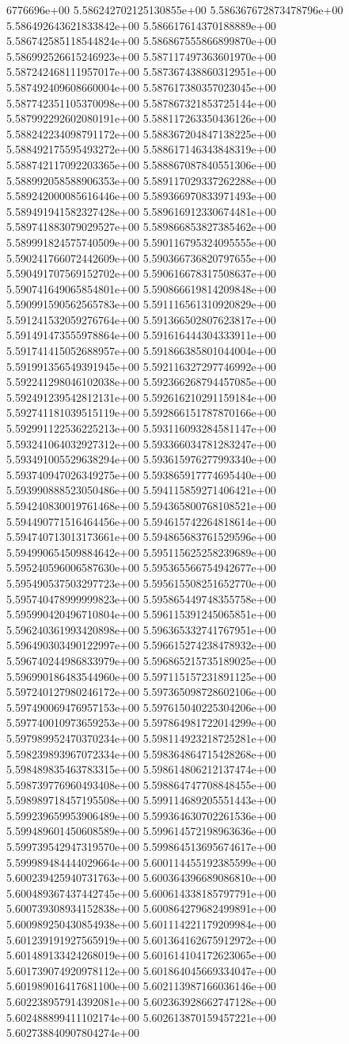 6776696e+00	5.586242702125130855e+00	5.586367672873478796e+00	5.586492643621833842e+00	5.586617614370188889e+00	5.586742585118544824e+00	5.586867555866899870e+00	5.586992526615246923e+00	5.587117497363601970e+00	5.587242468111957017e+00	5.587367438860312951e+00	5.587492409608660004e+00	5.587617380357023045e+00	5.587742351105370098e+00	5.587867321853725144e+00	5.587992292602080191e+00	5.588117263350436126e+00	5.588242234098791172e+00	5.588367204847138225e+00	5.588492175595493272e+00	5.588617146343848319e+00	5.588742117092203365e+00	5.588867087840551306e+00	5.588992058588906353e+00	5.589117029337262288e+00	5.589242000085616446e+00	5.589366970833971493e+00	5.589491941582327428e+00	5.589616912330674481e+00	5.589741883079029527e+00	5.589866853827385462e+00	5.589991824575740509e+00	5.590116795324095555e+00	5.590241766072442609e+00	5.590366736820797655e+00	5.590491707569152702e+00	5.590616678317508637e+00	5.590741649065854801e+00	5.590866619814209848e+00	5.590991590562565783e+00	5.591116561310920829e+00	5.591241532059276764e+00	5.591366502807623817e+00	5.591491473555978864e+00	5.591616444304333911e+00	5.591741415052688957e+00	5.591866385801044004e+00	5.591991356549391945e+00	5.592116327297746992e+00	5.592241298046102038e+00	5.592366268794457085e+00	5.592491239542812131e+00	5.592616210291159184e+00	5.592741181039515119e+00	5.592866151787870166e+00	5.592991122536225213e+00	5.593116093284581147e+00	5.593241064032927312e+00	5.593366034781283247e+00	5.593491005529638294e+00	5.593615976277993340e+00	5.593740947026349275e+00	5.593865917774695440e+00	5.593990888523050486e+00	5.594115859271406421e+00	5.594240830019761468e+00	5.594365800768108521e+00	5.594490771516464456e+00	5.594615742264818614e+00	5.594740713013173661e+00	5.594865683761529596e+00	5.594990654509884642e+00	5.595115625258239689e+00	5.595240596006587630e+00	5.595365566754942677e+00	5.595490537503297723e+00	5.595615508251652770e+00	5.595740478999999823e+00	5.595865449748355758e+00	5.595990420496710804e+00	5.596115391245065851e+00	5.596240361993420898e+00	5.596365332741767951e+00	5.596490303490122997e+00	5.596615274238478932e+00	5.596740244986833979e+00	5.596865215735189025e+00	5.596990186483544960e+00	5.597115157231891125e+00	5.597240127980246172e+00	5.597365098728602106e+00	5.597490069476957153e+00	5.597615040225304206e+00	5.597740010973659253e+00	5.597864981722014299e+00	5.597989952470370234e+00	5.598114923218725281e+00	5.598239893967072334e+00	5.598364864715428268e+00	5.598489835463783315e+00	5.598614806212137474e+00	5.598739776960493408e+00	5.598864747708848455e+00	5.598989718457195508e+00	5.599114689205551443e+00	5.599239659953906489e+00	5.599364630702261536e+00	5.599489601450608589e+00	5.599614572198963636e+00	5.599739542947319570e+00	5.599864513695674617e+00	5.599989484444029664e+00	5.600114455192385599e+00	5.600239425940731763e+00	5.600364396689086810e+00	5.600489367437442745e+00	5.600614338185797791e+00	5.600739308934152838e+00	5.600864279682499891e+00	5.600989250430854938e+00	5.601114221179209984e+00	5.601239191927565919e+00	5.601364162675912972e+00	5.601489133424268019e+00	5.601614104172623065e+00	5.601739074920978112e+00	5.601864045669334047e+00	5.601989016417681100e+00	5.602113987166036146e+00	5.602238957914392081e+00	5.602363928662747128e+00	5.602488899411102174e+00	5.602613870159457221e+00	5.602738840907804274e+00